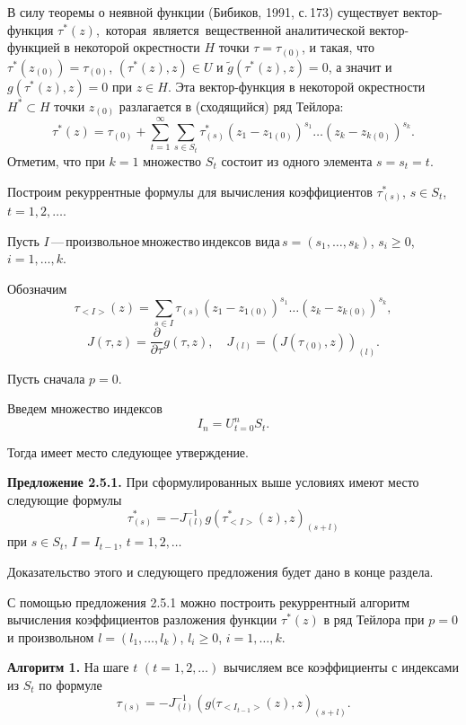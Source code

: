     В силу теоремы о неявной функции (Бибиков, 1991, с.\,173) существует
    вектор-функция $\tau^*(z)$,\, которая\, является\,
    ве\-ще\-ст\-вен\-ной аналитической вектор-функцией в некоторой
    окрестности $H$ точки $\tau=\tau_{(0)}$, и такая, что
    $\tau^*(z_{(0)})=\tau_{(0)}$, $(\tau^*(z),z)\in U$ и $\tilde
    g(\tau^*(z),z)=0$, а значит и $ g(\tau^*(z),z)=0$ при $z\in H$. Эта
    вектор-функция в некоторой окрестности $H^*\subset H$ точки
    $z_{(0)}$ разлагается в (сходящийся) ряд Тейлора:
    $$
    \tau^*(z)=\tau_{(0)}+ \sum^\infty_{t=1}\sum_{s\in S_t}
    \tau^*_{(s)}(z_1- z_{1(0)})^{s_1}\ldots(z_k-z_{k(0)})^{s_k}.
    $$
    Отметим, что при $k=1$ множество $S_t$ состоит из одного элемента
    $s=s_t=t$.

    Построим рекуррентные формулы для вычисления коэффициентов
    $\tau^*_{(s)}$, $s\in S_t$, $t=1,2,\ldots$.

    Пусть $I$\,---\,произвольное\,множество\,индексов
    вида\,$s=(s_1,\ldots,s_k)$, $s_i\geq 0$, $i=1,\ldots,k$.

    Обозначим
    $$
    \tau_{<I>}(z)=\sum_{s\in I}\tau_{(s)}(z_1-z_{1(0)})^{s_1}\ldots
    (z_k- z_{k(0)})^{s_k},
    $$
    $$
    J(\tau,z)=\frac{\partial}{\partial \tau}g(\tau,z),\quad
    J_{(l)}=\left(J(\tau_{(0)},z)\right)_{(l)}.
    $$

    Пусть сначала $p=0$.

    Введем множество индексов
    $$
    I_n=U^n_{t=0}S_t.
    $$

    Тогда имеет место следующее утверждение.

    \textbf{ Предложение 2.5.1.} { При сформулированных выше условиях
        имеют место следующие формулы
            $$
            \tau^*_{(s)}=-J^{-1}_{(l)}g(\tau^*_{<I>}(z),z)_{(s+l)}
        $$
            при $s\in S_t$,  $I=I_{t-1}$, $t=1,2,\ldots$ }

            Доказательство этого и следующего предложения будет дано в конце
            раздела.

            С помощью предложения 2.5.1 можно построить рекуррентный алгоритм
            вычисления коэффициентов разложения функции $\tau^*(z)$ в ряд
            Тейлора при $p=0$ и произвольном $l=(l_1,\ldots,l_k)$, $l_i\geq 0$,
            $i=1,\ldots,k$.

            \textbf{ Алгоритм 1.} На шаге $t$ $(t=1,2,\ldots)$ вычисляем все
            коэффициенты с индексами из $S_t$ по формуле
            $$
            \tau_{(s)}=-J^{-1}_{(l)}\left(g(\tau_{<I_{t-1}>}(z),z\right)_{(s+l)}.
                    $$

